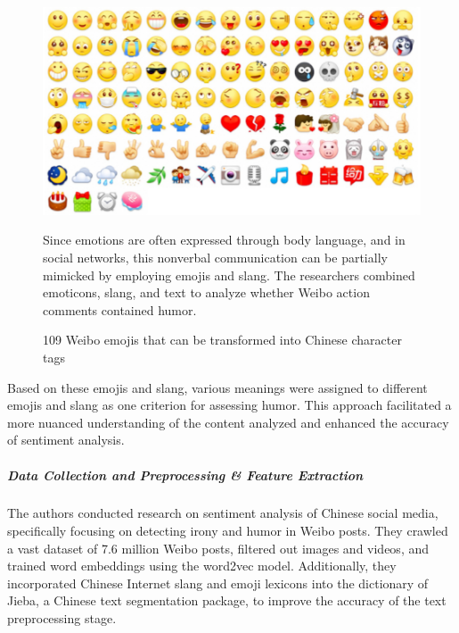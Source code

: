 \documentclass[a4paper]{article}
\begin{document}
\begin{figure}[H]
    \centering
    \begin{minipage}{0.48\textwidth}
        \centering
        \includegraphics[width=1\textwidth]{./images/108_Weibo_emojis.png}
        \caption{109 Weibo emojis that can be transformed into Chinese character tags\cite{ref_rnn2}}
        \label{fig.109 Weibo emojis that can be transformed into Chinese character tags.}
    \end{minipage}\hfill
    \begin{minipage}{0.48\textwidth}
        Since emotions are often expressed through body language, and in social networks, this nonverbal communication can be partially mimicked by employing emojis and slang. The researchers combined emoticons, slang, and text to analyze whether Weibo action comments contained humor.
    \end{minipage}
\end{figure}

Based on these emojis and slang, various meanings were assigned to different emojis and slang as one criterion for assessing humor. This approach facilitated a more nuanced understanding of the content analyzed and enhanced the accuracy of sentiment analysis.

\subparagraph{Data Collection and Preprocessing \& Feature Extraction}The authors conducted research on sentiment analysis of Chinese social media, specifically focusing on detecting irony and humor in Weibo posts. They crawled a vast dataset of 7.6 million Weibo posts, filtered out images and videos, and trained word embeddings using the word2vec model. Additionally, they incorporated Chinese Internet slang and emoji lexicons into the dictionary of Jieba, a Chinese text segmentation package, to improve the accuracy of the text preprocessing stage.
\end{document}
